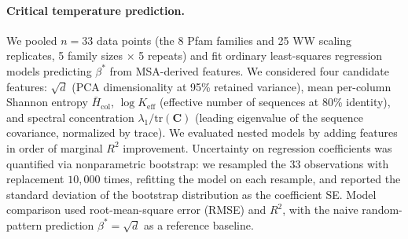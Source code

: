 \paragraph{Critical temperature prediction.}
We pooled $n{=}33$ data points (the 8 Pfam families and 25 WW scaling replicates, 5 family sizes $\times$ 5 repeats) and fit ordinary least-squares regression models predicting $\beta^*$ from MSA-derived features. We considered four candidate features: $\sqrt{d}$ (PCA dimensionality at 95\% retained variance), mean per-column Shannon entropy $\bar{H}_{\mathrm{col}}$, $\log K_{\mathrm{eff}}$ (effective number of sequences at 80\% identity), and spectral concentration $\lambda_1 / \mathrm{tr}(\mathbf{C})$ (leading eigenvalue of the sequence covariance, normalized by trace). We evaluated nested models by adding features in order of marginal $R^2$ improvement. Uncertainty on regression coefficients was quantified via nonparametric bootstrap: we resampled the 33 observations with replacement $10{,}000$ times, refitting the model on each resample, and reported the standard deviation of the bootstrap distribution as the coefficient SE. Model comparison used root-mean-square error (RMSE) and $R^2$, with the naive random-pattern prediction $\beta^* = \sqrt{d}$ as a reference baseline.
